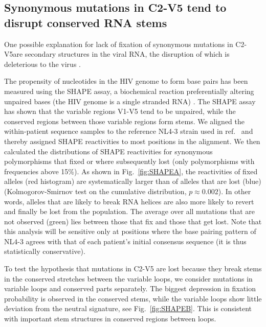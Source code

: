 \documentclass[rmp, twocolumn]{revtex4}
\newcommand{\FIG}[1]{Fig.~\ref{fig:#1}}
\newcommand{\shankaregion}{C2-V5}
\begin{document}
\subsection{Synonymous mutations in \shankaregion{} tend to disrupt conserved RNA stems}
One possible explanation for lack of fixation of synonymous mutations in
\shankaregion are secondary structures in the viral RNA, the disruption of which
is deleterious to the virus \citep{forsdyke_reciprocal_1995,
snoeck_mapping_2011, sanjuan_interplay_2011}.

The propensity of nucleotides in the HIV genome to form base pairs has been
measured using the SHAPE assay, a biochemical reaction preferentially altering
unpaired bases (the HIV genome is a single stranded RNA)
\citep{watts_architecture_2009}. The SHAPE assay has shown that the variable
regions V1-V5 tend to be unpaired, while the conserved regions between those
variable regions form stems.  We aligned the within-patient sequence samples 
to the reference NL4-3 strain used in ref.~\citep{watts_architecture_2009} and 
thereby assigned SHAPE reactivities to most positions in the alignment. 
We then calculated the distributions of SHAPE reactivities for synonymous 
polymorphisms that fixed or where subsequently lost (only polymorphisms with 
frequencies above 15\%).
As shown in \FIG{SHAPEA}, the reactivities of fixed alleles (red
histogram) are systematically larger than of alleles that are lost (blue)
(Kolmogorov-Smirnov test on the cumulative distribution, $p\approx 0.002$). In
other words, alleles that are likely to break RNA helices are also more likely
to revert and finally be lost from the population. The average over all
mutations that are not observed (green) lies between  those that fix and
those that get lost. Note that this analysis will be sensitive only at positions
where the base pairing pattern of NL4-3 agrees with that of each patient's
initial consensus sequence (it is thus statistically conservative).

To test the hypothesis that mutations in \shankaregion{} are lost because they
break stems in the conserved stretches between the variable loops, we consider
mutations in variable loops and conserved parts separately. The biggest
depression in fixation probability is observed in the conserved stems, while the
variable loops show little deviation from the neutral signature, see
\FIG{SHAPEB}. This is consistent with important stem structures in conserved
regions between loops.
\end{document}
